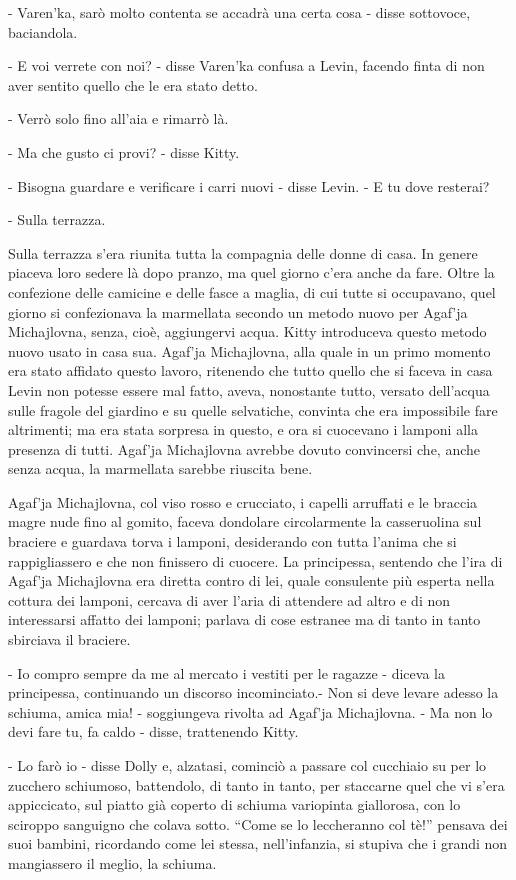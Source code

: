 - Varen'ka, sarò molto contenta se accadrà una certa cosa - disse sottovoce, baciandola. 

- E voi verrete con noi? - disse Varen'ka confusa a Levin, facendo finta di non aver sentito quello che le era stato detto. 

- Verrò solo fino all'aia e rimarrò là. 

- Ma che gusto ci provi? - disse Kitty. 

- Bisogna guardare e verificare i carri nuovi - disse Levin. - E tu dove resterai? 

- Sulla terrazza. 

Sulla terrazza s'era riunita tutta la compagnia delle donne di casa. In genere piaceva loro sedere là dopo pranzo, ma quel giorno c'era anche da fare. Oltre la confezione delle camicine e delle fasce a maglia, di cui tutte si occupavano, quel giorno si confezionava la marmellata secondo un metodo nuovo per Agaf'ja Michajlovna, senza, cioè, aggiungervi acqua. Kitty introduceva questo metodo nuovo usato in casa sua. Agaf'ja Michajlovna, alla quale in un primo momento era stato affidato questo lavoro, ritenendo che tutto quello che si faceva in casa Levin non potesse essere mal fatto, aveva, nonostante tutto, versato dell'acqua sulle fragole del giardino e su quelle selvatiche, convinta che era impossibile fare altrimenti; ma era stata sorpresa in questo, e ora si cuocevano i lamponi alla presenza di tutti. Agaf'ja Michajlovna avrebbe dovuto convincersi che, anche senza acqua, la marmellata sarebbe riuscita bene. 

Agaf'ja Michajlovna, col viso rosso e crucciato, i capelli arruffati e le braccia magre nude fino al gomito, faceva dondolare circolarmente la casseruolina sul braciere e guardava torva i lamponi, desiderando con tutta l'anima che si rappigliassero e che non finissero di cuocere. La principessa, sentendo che l'ira di Agaf'ja Michajlovna era diretta contro di lei, quale consulente più esperta nella cottura dei lamponi, cercava di aver l'aria di attendere ad altro e di non interessarsi affatto dei lamponi; parlava di cose estranee ma di tanto in tanto sbirciava il braciere. 

- Io compro sempre da me al mercato i vestiti per le ragazze - diceva la principessa, continuando un discorso incominciato.- Non si deve levare adesso la schiuma, amica mia! - soggiungeva rivolta ad Agaf'ja Michajlovna. - Ma non lo devi fare tu, fa caldo - disse, trattenendo Kitty. 

- Lo farò io - disse Dolly e, alzatasi, cominciò a passare col cucchiaio su per lo zucchero schiumoso, battendolo, di tanto in tanto, per staccarne quel che vi s'era appiccicato, sul piatto già coperto di schiuma variopinta giallorosa, con lo sciroppo sanguigno che colava sotto. ``Come se lo leccheranno col tè!'' pensava dei suoi bambini, ricordando come lei stessa, nell'infanzia, si stupiva che i grandi non mangiassero il meglio, la schiuma. 

